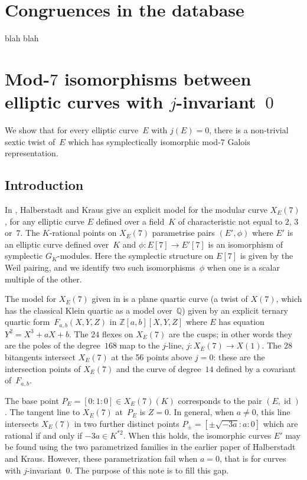 \documentclass[12pt]{amsart}
\newcommand{\Q}{\mathbb{Q}}
\newcommand{\Z}{\mathbb{Z}}
\DeclareMathOperator{\id}{id}
\numberwithin{equation}{section}
\theoremstyle{definition}
\theoremstyle{remark}
\begin{document}
\section{Congruences in the database}\label{S:statistics}

blah blah

\section{Mod-$7$ isomorphisms between elliptic curves with
  $j$-invariant~$0$}
We show that for every elliptic curve~$E$ with $j(E)=0$, there is a
non-trivial sextic twist of~$E$ which has symplectically isomorphic
mod-$7$ Galois representation.

\subsection{Introduction}
In \cite{Halberstadt-Kraus-XE7}, Halberstadt and Kraus give an
explicit model for the modular curve $X_E(7)$, for any elliptic curve
$E$ defined over a field~$K$ of characteristic not equal to $2$, $3$
or~$7$. The $K$-rational points on $X_E(7)$ parametrise pairs
$(E',\phi)$ where $E'$ is an elliptic curve defined over~$K$ and
$\phi:E[7]\to E'[7]$ is an isomorphism of symplectic $G_K$-modules.
Here the symplectic structure on $E[7]$ is given by the Weil pairing,
and we identify two such isomorphisms~$\phi$ when one is a scalar
multiple of the other.

The model for $X_E(7)$ given in \cite{Halberstadt-Kraus-XE7} is a
plane quartic curve (a twist of $X(7)$, which has the classical Klein
quartic as a model over~$\Q$) given by an explicit ternary quartic
form~$F_{a,b}(X,Y,Z)$ in $\Z[a,b][X,Y,Z]$ where $E$ has equation
$Y^2=X^3+aX+b$.  The $24$ flexes on $X_E(7)$ are the cusps; in other
words they are the poles of the degree~$168$ map to the $j$-line, $j:
X_E(7)\to X(1)$.  The $28$ bitangents intersect $X_E(7)$ at the 56
points above $j=0$: these are the intersection points of $X_E(7)$ and
the curve of degree~$14$ defined by a covariant of~$F_{a,b}$.

The base point $P_E=[0:1:0]\in X_E(7)(K)$ corresponds to the pair
$(E,\id)$.  The tangent line to $X_E(7)$ at~$P_E$ is $Z=0$.  In
general, when $a\not=0$, this line intersects $X_E(7)$ in two further
distinct points $P_{\pm}=[\pm\sqrt{-3a}:a:0]$ which are rational if
and only if $-3a\in K^{*2}$.  When this holds, the isomorphic curves
$E'$ may be found using the two parametrized families in the earlier
paper \cite{Halberstadt-Kraus-YE7} of Halberstadt and Kraus.  However,
these parametrization fail when $a=0$, that is for curves with
$j$-invariant~$0$.  The purpose of this note is to fill this gap.
\end{document}
